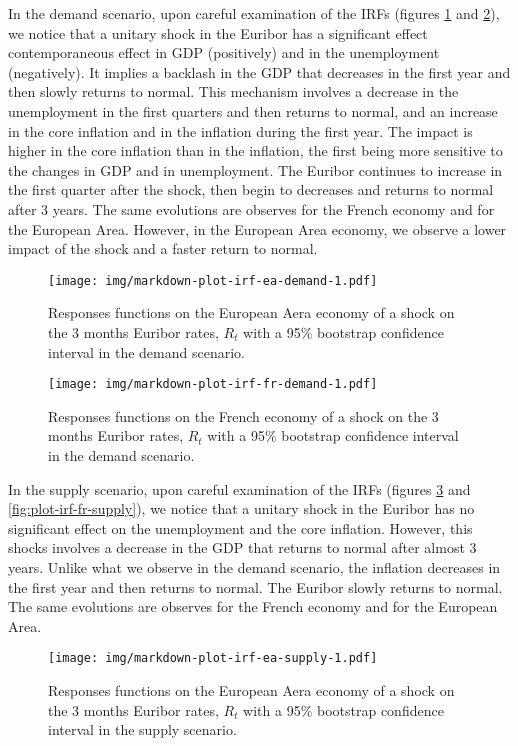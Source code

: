 \documentclass[
  10pt,
]{article}
\begin{document}
In the demand scenario, upon careful examination of the IRFs (figures \ref{fig:plot-irf-ea-demand} and \ref{fig:plot-irf-fr-demand}), we notice that a unitary shock in the Euribor has a significant effect contemporaneous effect in GDP (positively) and in the unemployment (negatively).
It implies a backlash in the GDP that decreases in the first year and then slowly returns to normal.
This mechanism involves a decrease in the unemployment in the first quarters and then returns to normal, and an increase in the core inflation and in the inflation during the first year. The impact is higher in the core inflation than in the inflation, the first being more sensitive to the changes in GDP and in unemployment. The Euribor continues to increase in the first quarter after the shock, then begin to decreases and returns to normal after 3 years.
The same evolutions are observes for the French economy and for the European Area. However, in the European Area economy, we observe a lower impact of the shock and a faster return to normal.

\begin{figure}
\centering
\texttt{[image: img/markdown-plot-irf-ea-demand-1.pdf]}
\caption{\label{fig:plot-irf-ea-demand}Responses functions on the European Aera economy of a shock on the 3 months Euribor rates, \(R_t\) with a 95\% bootstrap confidence interval in the demand scenario.}
\end{figure}

\begin{figure}
\centering
\texttt{[image: img/markdown-plot-irf-fr-demand-1.pdf]}
\caption{\label{fig:plot-irf-fr-demand}Responses functions on the French economy of a shock on the 3 months Euribor rates, \(R_t\) with a 95\% bootstrap confidence interval in the demand scenario.}
\end{figure}

In the supply scenario, upon careful examination of the IRFs (figures \ref{fig:plot-irf-ea-supply} and \ref{fig:plot-irf-fr-supply}), we notice that a unitary shock in the Euribor has no significant effect on the unemployment and the core inflation.
However, this shocks involves a decrease in the GDP that returns to normal after almost 3 years.
Unlike what we observe in the demand scenario, the inflation decreases in the first year and then returns to normal.
The Euribor slowly returns to normal.
The same evolutions are observes for the French economy and for the European Area.

\begin{figure}
\centering
\texttt{[image: img/markdown-plot-irf-ea-supply-1.pdf]}
\caption{\label{fig:plot-irf-ea-supply}Responses functions on the European Aera economy of a shock on the 3 months Euribor rates, \(R_t\) with a 95\% bootstrap confidence interval in the supply scenario.}
\end{figure}
\end{document}

